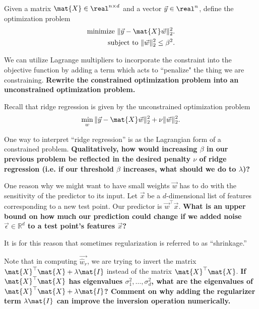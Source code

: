 \documentclass[preview]{standalone}
\begin{document}
\begin{Parts}



	\Part Given a matrix $\mat{X} \in \real^{n \times d}$ and a vector $\vec{y} \in \real^n$, define the optimization problem
	\begin{align}
		\text{minimize } \| \vec{y} - \mat{X} \vec{w} \|_2^2. \label{eq:constrained} \\
		\text{subject to } \|\vec{w} \|_2^2 \leq \beta^2. \notag
	\end{align}

	We can utilize Lagrange multipliers to incorporate the constraint into the objective function by adding a term which acts to ``penalize" the thing we are constraining. {\bf Rewrite the constrained optimization problem into an unconstrained optimization problem.}

	

	\Part Recall that ridge regression is given by the unconstrained optimization problem
	\begin{align}
		\min_{w} \| \vec{y} - \mat{X} \vec{w} \|_2^2 + \nu \|\vec{w}\|_2^2. \label{eq:ridge}
	\end{align}

	One way to interpret ``ridge regression'' is as the Lagrangian form of a constrained problem. {\bf Qualitatively, how would increasing $\beta$ in our previous problem be reflected in the desired penalty $\nu$ of ridge regression (i.e. if our threshold $\beta$ increases, what should we do to $\lambda$)?}

	
	
	

	\Part One reason why we might want to have small weights $\vec{w}$ has to do with the sensitivity of the predictor to its input. Let $\vec{x}$ be a $d$-dimensional list of features corresponding to a new test point. Our predictor is $\vec{w}^\top \vec{x}$. {\bf What is an upper bound on how much our prediction could change if we added noise $\vec{\epsilon} \in \mathbb{R}^d$ to a test point's features $\vec{x}$? }

	

	 It is for this reason that sometimes regularization is referred to as ``shrinkage.''

	
	\Part Note that in computing $\vec{\hat{w}_r}$, we are trying to invert the matrix $\mat{X}^\top \mat{X} + \lambda \mat{I}$ instead of the matrix $\mat{X}^\top \mat{X}$. {\bf If $\mat{X}^\top \mat{X}$ has eigenvalues $\sigma_1^2, \ldots, \sigma_d^2$, what are the eigenvalues of $\mat{X}^\top \mat{X} + \lambda \mat{I}$? Comment on why adding the regularizer term $\lambda \mat{I}$ can improve the inversion operation numerically.}


\end{Parts}
\end{document}
